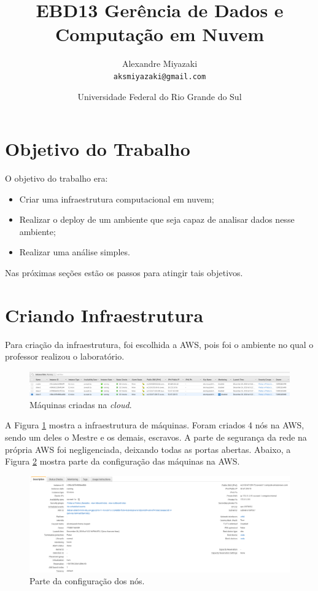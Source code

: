 \documentclass{article}
\title{EBD13 Gerência de Dados e Computação em Nuvem} %
\author{Alexandre Miyazaki\\ \texttt{aksmiyazaki@gmail.com}} %
\date{Universidade Federal do Rio Grande do Sul} %
\begin{document}
\maketitle %

\section*{Objetivo do Trabalho} %

O objetivo do trabalho era:

\begin{itemize}
\item Criar uma infraestrutura computacional em nuvem;
\item Realizar o deploy de um ambiente que seja capaz de analisar dados nesse ambiente;
\item Realizar uma análise simples.
\end{itemize}

Nas próximas seções estão os passos para atingir tais objetivos.


\section{Criando Infraestrutura} %

Para criação da infraestrutura, foi escolhida a AWS, pois foi o ambiente no qual o professor realizou o laboratório.

\begin{figure}[h]
  \includegraphics[width=\linewidth]{img/machines_created.png}
  \caption{Máquinas criadas na \emph{cloud}.}
  \label{fig:fig_maq_criad}
\end{figure}

A Figura \ref{fig:fig_maq_criad} mostra a infraestrutura de máquinas. Foram criados 4 nós na AWS, sendo um deles o Mestre e os demais, escravos. 
A parte de segurança da rede na própria AWS foi negligenciada, deixando todas as portas abertas. Abaixo, a Figura \ref{fig:machine_config} mostra parte da configuração das máquinas na AWS.


\begin{figure}[h]
  \includegraphics[width=\linewidth]{img/machine_config.png}
  \caption{Parte da configuração dos nós.}
  \label{fig:machine_config}
\end{figure}
\end{document}
